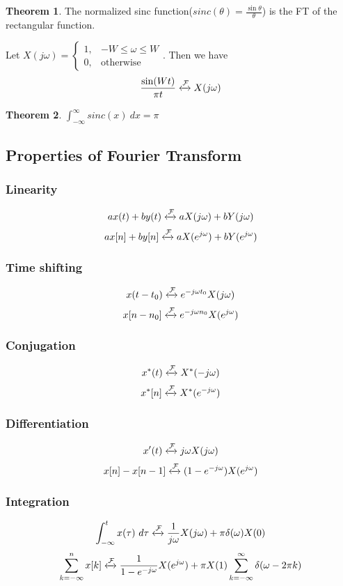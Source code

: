 \documentclass[10pt, a4paper]{extarticle}
\theoremstyle{definition}
\newtheorem*{thm}{Theorem}
\begin{document}
	\begin{thm}
		The normalized sinc function($sinc(\theta)=\frac{\sin\theta}{\theta}$) is the FT of the rectangular function.
	\end{thm}
	Let $X(j\omega)=\begin{cases}
		1,& -W\leq\omega\leq W\\
		0,& \text{otherwise}
		\end{cases}$. Then we have\[\frac{\sin(Wt)}{\pi t}\xleftrightarrow{\mathcal{F}}X(j\omega)\]
		\begin{thm}
			$\int_{-\infty}^{\infty}sinc(x)\ dx=\pi$
		\end{thm}

		\subsection{Properties of Fourier Transform}
		\subsubsection{Linearity}
		\[ax(t)+by(t)\xleftrightarrow{\mathcal{F}}aX(j\omega)+bY(j\omega)\]
		\[ax[n]+by[n]\xleftrightarrow{\mathcal{F}}aX(e^{j\omega})+bY(e^{j\omega})\]
		\subsubsection{Time shifting}
		\[x(t-t_0)\xleftrightarrow{\mathcal{F}}e^{-j\omega t_0}X(j\omega)\]
		\[x[n-n_0]\xleftrightarrow{\mathcal{F}}e^{-j\omega n_0}X(e^{j\omega})\]
		\subsubsection{Conjugation}
		\[x^*(t)\xleftrightarrow{\mathcal{F}}X^*(-j\omega)\]
		\[x^*[n]\xleftrightarrow{\mathcal{F}}X^*(e^{-j\omega})\]
		\subsubsection{Differentiation}
		\[x'(t)\xleftrightarrow{\mathcal{F}}j\omega X(j\omega)\]
		\[x[n]-x[n-1]\xleftrightarrow{\mathcal{F}}(1-e^{-j\omega})X(e^{j\omega})\]
		\subsubsection{Integration}
		\[\int_{-\infty}^t x(\tau)\ d\tau\xleftrightarrow{\mathcal{F}}\frac{1}{j\omega}X(j\omega)+\pi\delta(\omega)X(0)\]
		\[\sum_{k=-\infty}^n x[k]\xleftrightarrow{\mathcal{F}}\frac{1}{1-e^{-j\omega}}X(e^{j\omega})+\pi X(1)\sum_{k=-\infty}^{\infty}\delta(\omega-2\pi k)\]
\end{document}
